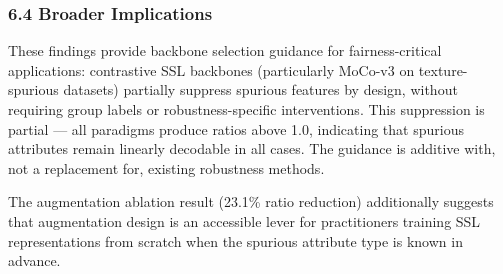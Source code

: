 \subsubsection{6.4 Broader Implications}

These findings provide backbone selection guidance for fairness-critical applications: contrastive SSL backbones (particularly MoCo-v3 on texture-spurious datasets) partially suppress spurious features by design, without requiring group labels or robustness-specific interventions. This suppression is partial --- all paradigms produce ratios above 1.0, indicating that spurious attributes remain linearly decodable in all cases. The guidance is additive with, not a replacement for, existing robustness methods.

The augmentation ablation result (23.1\% ratio reduction) additionally suggests that augmentation design is an accessible lever for practitioners training SSL representations from scratch when the spurious attribute type is known in advance.

